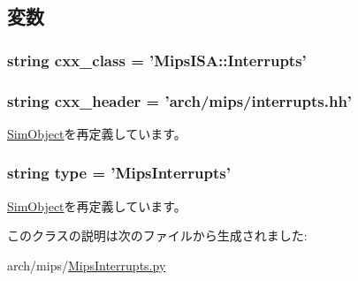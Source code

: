 \subsection{変数}
\hypertarget{classMipsInterrupts_1_1MipsInterrupts_a58cd55cd4023648e138237cfc0822ae3}{
\subsubsection[{cxx\_\-class}]{\setlength{\rightskip}{0pt plus 5cm}string {\bf cxx\_\-class} = '{\bf MipsISA::Interrupts}'}}
\label{classMipsInterrupts_1_1MipsInterrupts_a58cd55cd4023648e138237cfc0822ae3}
\hypertarget{classMipsInterrupts_1_1MipsInterrupts_a17da7064bc5c518791f0c891eff05fda}{
\subsubsection[{cxx\_\-header}]{\setlength{\rightskip}{0pt plus 5cm}string {\bf cxx\_\-header} = 'arch/mips/interrupts.hh'}}
\label{classMipsInterrupts_1_1MipsInterrupts_a17da7064bc5c518791f0c891eff05fda}


\hyperlink{classm5_1_1SimObject_1_1SimObject_a17da7064bc5c518791f0c891eff05fda}{SimObject}を再定義しています。\hypertarget{classMipsInterrupts_1_1MipsInterrupts_acce15679d830831b0bbe8ebc2a60b2ca}{
\subsubsection[{type}]{\setlength{\rightskip}{0pt plus 5cm}string {\bf type} = '{\bf MipsInterrupts}'}}
\label{classMipsInterrupts_1_1MipsInterrupts_acce15679d830831b0bbe8ebc2a60b2ca}


\hyperlink{classm5_1_1SimObject_1_1SimObject_acce15679d830831b0bbe8ebc2a60b2ca}{SimObject}を再定義しています。

このクラスの説明は次のファイルから生成されました:\begin{DoxyCompactItemize}
\item 
arch/mips/\hyperlink{MipsInterrupts_8py}{MipsInterrupts.py}\end{DoxyCompactItemize}
